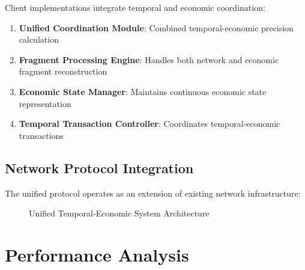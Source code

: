 \documentclass[12pt,a4paper]{article}
\begin{document}
Client implementations integrate temporal and economic coordination:

\begin{enumerate}
\item \textbf{Unified Coordination Module}: Combined temporal-economic precision calculation
\item \textbf{Fragment Processing Engine}: Handles both network and economic fragment reconstruction
\item \textbf{Economic State Manager}: Maintains continuous economic state representation
\item \textbf{Temporal Transaction Controller}: Coordinates temporal-economic transactions
\end{enumerate}

\subsection{Network Protocol Integration}

The unified protocol operates as an extension of existing network infrastructure:

\begin{figure}[htbp]
\centering
{}
\caption{Unified Temporal-Economic System Architecture}
\end{figure}

\section{Performance Analysis}
\end{document}
